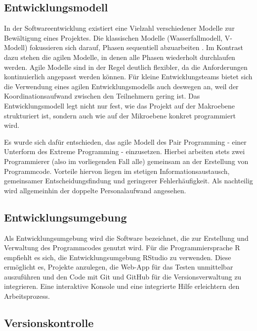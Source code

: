 \documentclass[
]{article}
\begin{document}
\hypertarget{entwicklungsmodell}{%
\subsection{Entwicklungsmodell}\label{entwicklungsmodell}}

In der Softwareentwicklung existiert eine Vielzahl verschiedener Modelle zur Bewältigung eines Projektes. Die klassischen Modelle (Wasserfallmodell, V-Modell) fokussieren sich darauf, Phasen sequentiell abzuarbeiten \autocite[S.5]{Berndes2002}. Im Kontrast dazu stehen die agilen Modelle, in denen alle Phasen wiederholt durchlaufen werden. Agile Modelle sind in der Regel deutlich flexibler, da die Anforderungen kontinuierlich angepasst werden können. Für kleine Entwicklungsteams bietet sich die Verwendung eines agilen Entwicklungsmodells auch deswegen an, weil der Koordinationsaufwand zwischen den Teilnehmern gering ist. Das Entwicklungsmodell legt nicht nur fest, wie das Projekt auf der Makroebene strukturiert ist, sondern auch wie auf der Mikroebene konkret programmiert wird. \autocite{Padberg2007}

Es wurde sich dafür entschieden, das agile Modell des Pair Programming - einer Unterform des Extreme Programming - einzusetzen. Hierbei arbeiten stets zwei Programmierer (also im vorliegenden Fall alle) gemeinsam an der Erstellung von Programmcode. Vorteile hiervon liegen im stetigen Informationsaustausch, gemeinsamer Entscheidungsfindung und geringerer Fehlerhäufigkeit. Als nachteilig wird allgemeinhin der doppelte Personalaufwand angesehen. \autocite{Padberg2007}

\hypertarget{entwicklungsumgebung}{%
\subsection{Entwicklungsumgebung}\label{entwicklungsumgebung}}

Als Entwicklungsumgebung wird die Software bezeichnet, die zur Erstellung und Verwaltung des Programmcodes genutzt wird. Für die Programmiersprache R empfiehlt es sich, die Entwicklungsumgebung RStudio zu verwenden. Diese ermöglicht es, Projekte anzulegen, die Web-App für das Testen unmittelbar auszuführen und den Code mit Git und GitHub für die Versionsverwaltung zu integrieren. Eine interaktive Konsole und eine integrierte Hilfe erleichtern den Arbeitsprozess.

\hypertarget{versionskontrolle}{%
\subsection{Versionskontrolle}\label{versionskontrolle}}
\end{document}
